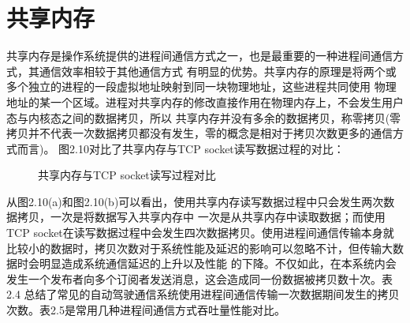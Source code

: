 \section{共享内存}
共享内存是操作系统提供的进程间通信方式之一，也是最重要的一种进程间通信方式，其通信效率相较于其他通信方式
有明显的优势。共享内存的原理是将两个或多个独立的进程的一段虚拟地址映射到同一块物理地址，这些进程共同使用
物理地址的某一个区域。进程对共享内存的修改直接作用在物理内存上，不会发生用户态与内核态之间的数据拷贝，所以
共享内存并没有多余的数据拷贝，称零拷贝(零拷贝并不代表一次数据拷贝都没有发生，零的概念是相对于拷贝次数更多的通信方式而言)。
图2.10对比了共享内存与TCP socket读写数据过程的对比：
\begin{figure}[H]
  \centering
  \caption{共享内存与TCP socket读写过程对比}
  \label{Fig.13}
\end{figure}
从图2.10(a)和图2.10(b)可以看出，使用共享内存读写数据过程中只会发生两次数据拷贝，一次是将数据写入共享内存中
一次是从共享内存中读取数据；而使用TCP socket在读写数据过程中会发生四次数据拷贝。使用进程间通信传输本身就
比较小的数据时，拷贝次数对于系统性能及延迟的影响可以忽略不计，但传输大数据时会明显造成系统通信延迟的上升以及性能
的下降。不仅如此，在本系统内会发生一个发布者向多个订阅者发送消息，这会造成同一份数据被拷贝数十次。表2.4
总结了常见的自动驾驶通信系统使用进程间通信传输一次数据期间发生的拷贝次数。表2.5是常用几种进程间通信方式吞吐量性能对比。
\begin{table}[H]
  \centering\small
  \caption{自动驾驶通信系统数据拷贝次数总结\cite{8968462}}
  \label{tab:exampletable}
\end{table}

